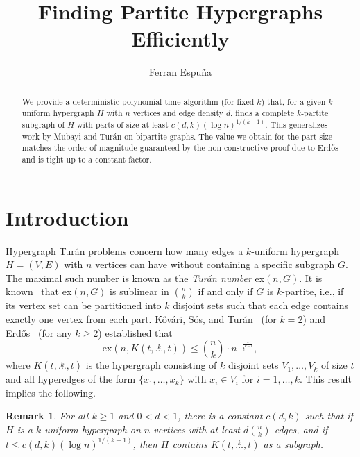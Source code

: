 \documentclass{amsart}
\title{Finding Partite Hypergraphs Efficiently}
\author[Ferran Espu\~{n}a]{Ferran Espu\~{n}a}
\newcommand{\ex}[2]{\ensuremath{\mathrm{ex}(#1, #2)}}
\newcommand{\compoverset}[2]{\ensuremath{K(#2, \overset{#1}{\dots}, #2)}}
\newtheorem{remark}[subsection]{Remark}
\begin{document}
    \begin{abstract}
    We provide a deterministic polynomial-time algorithm (for fixed $k$) that, for a given $k$-uniform hypergraph $H$ with $n$ vertices and edge density $d$,
    finds a complete $k$-partite subgraph of $H$ with parts of size at least ${c(d, k)(\log n)^{1/(k-1)}}$.
    This generalizes work by Mubayi and Tur\'{a}n on bipartite graphs.
    The value we obtain for the part size matches the order of magnitude guaranteed by the non-constructive proof due to
    Erd\H{o}s and is tight up to a constant factor.
    \end{abstract}

    \maketitle


    \section{Introduction}\label{sec:introduction}

    Hypergraph Tur\'{a}n problems concern how many edges a $k$-uniform hypergraph $H = (V, E)$ with $n$ vertices can have without containing a specific subgraph $G$.
    The maximal such number is known as the \emph{Tur\'{a}n number} $\ex{n}{G}$.
    It is known~\cite{keevash2011hypergraph}
    that $\ex{n}{G}$ is sublinear in $\binom{n}{k}$ if and only if $G$ is $k$-partite, i.e.,
    if its vertex set can be partitioned into $k$ disjoint sets such that each edge contains exactly one vertex from each part.
    K\H{o}v\'{a}ri, S\'{o}s, and Tur\'{a}n~\cite{Kovari1954} (for $k=2$) and
    Erd\H{o}s~\cite{Erdos1964} (for any $k \geq 2$) established that
    \begin{equation} \label{eq:erdos_extremal}
        \ex{n}{\compoverset{k}{t}} \leq \binom{n}{k} \cdot n^{-\frac{1}{t^{k-1}}},
    \end{equation}
    where $\compoverset{k}{t}$ is the hypergraph consisting of $k$ disjoint sets $V_1, \dots, V_k$ of size $t$
    and all hyperedges of the form $\{x_1, \dots, x_k\}$ with $x_i \in V_i$ for $i = 1, \dots, k$.
    This result implies the following.

    \begin{remark} \label{rk:order}
        For all $k \geq 1$ and $0 < d < 1$, there is a constant $c(d, k)$ such that if
        $H$ is a $k$-uniform hypergraph on $n$ vertices with at least $d \binom{n}{k}$ edges,
        and if $t \leq c(d, k) (\log n)^{1/(k-1)}$,
        then $H$ contains $\compoverset{k}{t}$ as a subgraph.
    \end{remark}
\end{document}
